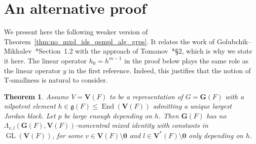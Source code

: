 \documentclass[a4paper,12pt]{amsproc}
\DeclareMathOperator{\GL}{GL}%
\DeclareMathOperator{\End}{End}
\theoremstyle{plain}
\newtheorem{theorem}[definition]{Theorem}
\theoremstyle{definition}
\begin{document}
\section{An alternative proof}

We present here the following weaker version of Theorem~\ref{thm:no_mxd_ids_qsmpl_alg_grps}.
It relates the work of Golubchik--Mikhalev~\cite{golubchikmikhalev1982generalized}*{Section~1.2} with the approach of Tomanov~\cite{tomanov1985generalized}*{\S 2}, which is why we state it here. The linear operator $h_0=h^{m-1}$ in the proof below plays the same role as the linear operator $y$ in the first reference. Indeed, this justifies that the notion of T-smallness is natural to consider.

\begin{theorem}\label{thm:main_wo_neq2}
Assume $V=\mathbf{V}(F)$ to be a representation of $G=\mathbf{G}(F)$ with a nilpotent element $h\in\mathfrak{g}(F)\leq\End(\mathbf{V}(F))$ admitting a unique largest Jordan block. Let $p$ be large enough depending on $h$. Then $\mathbf{G}(F)$ has no $\Lambda_{v,l}(\mathbf{G}(F),\mathbf{V}(F))$-noncentral mixed identity with constants in $\GL(\mathbf{V}(F))$, for some $v\in\mathbf{V}(F)\setminus\mathbf{0}$ and $l\in\mathbf{V}^\ast(F)\setminus\mathbf{0}$ only depending on $h$.
\end{theorem}
\end{document}
